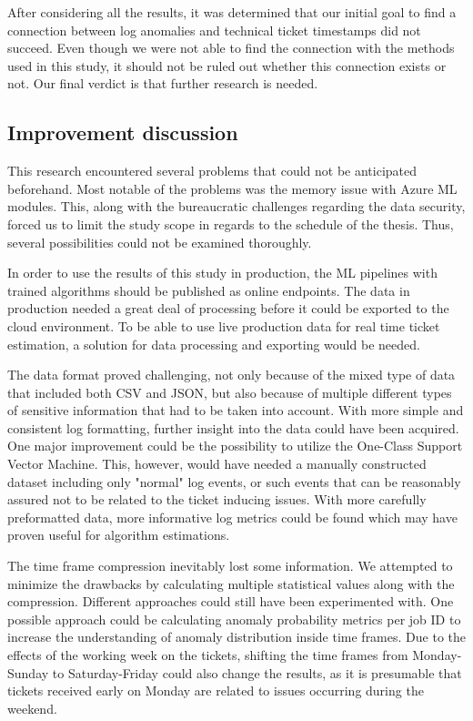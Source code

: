After considering all the results,
it was determined that our initial goal to find a connection between log anomalies and technical ticket timestamps
did not succeed.
Even though we were not able to find the connection with the methods used in this study,
it should not be ruled out whether this connection exists or not.
Our final verdict is that further research is needed.


\subsection{Improvement discussion}\label{subsec:discussion}

This research encountered several problems
that could not be anticipated beforehand.
Most notable of the problems was the memory issue
with Azure ML modules.
This,
along with the bureaucratic challenges regarding the data security,
forced us to limit the study scope in regards to the schedule of the thesis.
Thus,
several possibilities could not be examined thoroughly.

In order to use the results of this study in production,
the ML pipelines with trained algorithms should be published as online endpoints.
The data in production needed a great deal of processing before
it could be exported to the cloud environment.
To be able to use live production data for real time ticket estimation,
a solution for data processing and exporting would be needed.

The data format proved challenging,
not only because of the mixed type of data that included both CSV and JSON,
but also because of multiple different types of sensitive information
that had to be taken into account.
With more simple and consistent log formatting,
further insight into the data could have been acquired.
One major improvement could be the possibility to utilize the One-Class Support Vector Machine.
This, however,
would have needed a manually constructed dataset
including only "normal" log events,
or such events that can be reasonably assured
not to be related to the ticket inducing issues.
With more carefully preformatted data,
more informative log metrics could be found
which may have proven useful for algorithm estimations.

The time frame compression inevitably lost some information.
We attempted to minimize the drawbacks
by calculating multiple statistical values along with the compression.
Different approaches could still have been experimented with.
One possible approach could be calculating anomaly probability metrics per job ID
to increase the understanding of anomaly distribution inside time frames.
Due to the effects of the working week on the tickets,
shifting the time frames from Monday-Sunday to Saturday-Friday
could also change the results,
as it is presumable that tickets received early on Monday
are related to issues occurring during the weekend.

